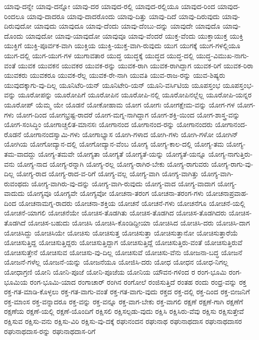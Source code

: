 {ಯಾವು-ದನ್ನೇ
ಯಾವು-ದನ್ನೋ
ಯಾವು-ದರ
ಯಾವುದ-ರಲ್ಲಿ
ಯಾವುದ-ರಲ್ಲಿಯೂ
ಯಾವುದ-ರಿಂದ
ಯಾವುದ-ರಿಂದಲೂ
ಯಾವು-ದಾದರೂ
ಯಾವು-ದಾದರೊಂದು
ಯಾವು-ದಿತ್ತು
ಯಾವು-ದಿದೆ
ಯಾವು-ದಿರುವುದು
ಯಾವು-ದಿರುವುದೋ
ಯಾವುದು
ಯಾವುದೂ
ಯಾವು-ದೆಂದು
ಯಾವು-ದೆಂಬು-ದನ್ನು
ಯಾವುದೇ
ಯಾವುದೊ
ಯಾವು-ದೊಂದು
ಯಾವುದೋ
ಯಾವು-ಯಾವುದೋ
ಯಾವುವೂ
ಯಾವು-ವೆಂದರೆ
ಯುಕ್ತ-ವೆಂದು
ಯುಕ್ತಾಯುಕ್ತ
ಯುಕ್ತಿ
ಯುಕ್ತಿಗೆ
ಯುಕ್ತಿ-ಪೂರ್ವಕ-ವಾಗಿ
ಯುಕ್ತಿಯ
ಯುಕ್ತಿ-ಯುಕ್ತ-ವಾಗಿ-ರುವುದು
ಯುಗ
ಯುಗಕ್ಕೆ
ಯುಗ-ಗಳಲ್ಲಿಯೂ
ಯುಗ-ದಲ್ಲಿ
ಯುಗ-ಯುಗ-ಗಳ
ಯುಗಾವತಾರ
ಯುದ್ಧ
ಯುದ್ಧಕ್ಕೆ
ಯುದ್ಧದ
ಯುದ್ಧ-ದಲ್ಲಿ
ಯುದ್ಧ-ವಿಮುಖ-ನಾಗು-ವಂತೆ
ಯುವಕ
ಯುವಕನ
ಯುವಕರ
ಯುವಕ-ರನ್ನು
ಯುವಕ-ರಾಗಿ
ಯುವಕ-ರಾಗಿದ್ದಾಗ
ಯುವಕ-ರಿಗೆ
ಯುವಕ-ರಿರಾ
ಯುವಕರು
ಯುವಕರೂ
ಯುವಕ-ರೆಲ್ಲ
ಯುವಕ-ರೇ-ನಾಗಿ
ಯುವತಿ
ಯುವ-ರಾಜ-ರನ್ನು
ಯುವ-ಶಿಷ್ಯರು
ಯುವುದಕ್ಕಾಗು-ವು-ದಿಲ್ಲ
ಯೂನಿಟೆರಿ-ಯನ್
ಯೂನಿಟೇರಿ-ಯನ್
ಯೂನಿ-ವರ್ಸಿಟಿಯ
ಯೂಪಸ್ತಂಭ
ಯೂಪಸ್ತಂಭ-ವನ್ನು
ಯೂರೋಪನ್ನು
ಯೂರೋಪಿಗೆ
ಯೂರೋಪಿನ
ಯೂರೋಪಿ-ನಲ್ಲಿ
ಯೂರೋಪಿನಲ್ಲೆಲ್ಲ
ಯೂರೋಪಿ-ಯನ್ನರ
ಯೂರೋಪ್
ಯೆಮ್ಮ
ಯೇ
ಯೊಡನೆ
ಯೋಕೋಹಾಮ
ಯೋಗ
ಯೋಗಃ
ಯೋಗಕ್ಷೇಮ-ವನ್ನು
ಯೋಗ-ಗಳ
ಯೋಗ-ಗಳು
ಯೋಗ-ದಿಂದ
ಯೋಗಭ್ರಷ್ಟ-ರಾದರೆ
ಯೋಗ-ಮಗ್ನ-ನಾಗಿದ್ದಾಗ
ಯೋಗ-ಶಕ್ತಿ-ಯಿಂದ
ಯೋಗ-ಶಾಸ್ತ್ರ-ವನ್ನು
ಯೋಗ-ಸಂಸಿದ್ಧಿಂ
ಯೋಗಾಚ್ಚಲಿತ-ಮಾನಸಃ
ಯೋಗಾನಂದ
ಯೋಗಾನಂದ-ರನ್ನು
ಯೋಗಾನಂದರು
ಯೋಗಾನಂದ-ರೊಡನೆ
ಯೋಗಾನಂದಸ್ವಾಮಿ-ಗಳು
ಯೋಗಾಭ್ಯಾಸ
ಯೋಗಿ-ಗಳಾದ
ಯೋಗಿ-ಗಳು
ಯೋಗಿ-ಗಳೋ
ಯೋಗಿನ್
ಯೋಗಿಯ
ಯೋಗೋದ್ಯಾನ-ದಲ್ಲಿ
ಯೋಗೋದ್ಯಾನ-ವೆಂಬ
ಯೋಗ್ಯ
ಯೋಗ್ಯ-ಕಾಲ-ದಲ್ಲಿ
ಯೋಗ್ಯ-ತಮ
ಯೋಗ್ಯ-ತಮ-ವಾದದ್ದು
ಯೋಗ್ಯ-ತಮವೇ
ಯೋಗ್ಯತಾ
ಯೋಗ್ಯತೆ
ಯೋಗ್ಯತೆ-ಯನ್ನು
ಯೋಗ್ಯತೆ-ಯನ್ನೂ
ಯೋಗ್ಯ-ನಾಗುತ್ತಿರು-ವನು
ಯೋಗ್ಯ-ನಾದ
ಯೋಗ್ಯ-ರನ್ನಾಗಿ
ಯೋಗ್ಯ-ರಲ್ಲ
ಯೋಗ್ಯ-ರಾಗಿರ-ಬೇಕು
ಯೋಗ್ಯ-ರಾಗುವರು
ಯೋಗ್ಯ-ರಾಗು-ವು-ದಿಲ್ಲ
ಯೋಗ್ಯ-ರಾದ
ಯೋಗ್ಯ-ರಾದ-ವ-ರಿಗೆ
ಯೋಗ್ಯ-ವಲ್ಲ
ಯೋಗ್ಯ-ವಾಗಿ
ಯೋಗ್ಯ-ವಾಗಿತ್ತು
ಯೋಗ್ಯ-ವಾಗಿ-ರುವಂಥದು
ಯೋಗ್ಯ-ವಾಗಿರು-ವು-ದನ್ನು
ಯೋಗ್ಯ-ವಾಗಿ-ರುವುದು
ಯೋಗ್ಯ-ವಾದ
ಯೋಗ್ಯ-ವಾದಾಗ
ಯೋಗ್ಯ-ವಾದುದು
ಯೋಗ್ಯವೂ
ಯೋಗ್ಯವೇ
ಯೋಗ್ಯವೋ
ಯೋಚನಾ-ತರಂಗ
ಯೋಚನಾ-ತರಂಗ-ಗಳು
ಯೋಚನಾಪ್ರವಾಹ-ದಿಂದ
ಯೋಚನಾಮಗ್ನ-ರಾದರು
ಯೋಚನಾ-ಶಕ್ತಿಯ
ಯೋಚನೆ
ಯೋಚನೆ-ಗಳು
ಯೋಚನೆಗೂ
ಯೋಚನೆ-ಯಲ್ಲಿ
ಯೋಚನೆ-ಯಾಗಲಿ
ಯೋಚನೆಯೇ
ಯೋಚಿಸ-ತೊಡಗಿತು
ಯೋಚಿಸ-ತೊಡಗಿದ
ಯೋಚಿಸ-ತೊಡಗಿದರು
ಯೋಚಿಸ-ತೊಡಗಿದೆ
ಯೋಚಿಸ-ಬಹುದು
ಯೋಚಿಸಿ
ಯೋಚಿಸಿ-ಕೊಂಡಿದ್ದೀಯಾ
ಯೋಚಿಸಿದ
ಯೋಚಿಸಿ-ದರು
ಯೋಚಿಸಿ-ದಾಗ
ಯೋಚಿಸಿದ್ದು
ಯೋಚಿಸಿಯೇ
ಯೋಚಿಸು
ಯೋಚಿಸುತ್ತ
ಯೋಚಿಸುತ್ತಾ
ಯೋಚಿಸುತ್ತಾನೋ
ಯೋಚಿಸುತ್ತಾರೆಯೆ
ಯೋಚಿಸುತ್ತಿದ್ದ
ಯೋಚಿಸುತ್ತಿದ್ದರು
ಯೋಚಿಸುತ್ತಿದ್ದಾಗ
ಯೋಚಿಸುತ್ತಿದ್ದೆ
ಯೋಚಿಸುತ್ತಿರು-ವಂತೆ
ಯೋಚಿಸುತ್ತಿರುವೆ
ಯೋಚಿಸುತ್ತೇನೆ
ಯೋಚಿಸುವ
ಯೋಚಿಸು-ವು-ದಿಲ್ಲ
ಯೋಚಿಸುವೆ
ಯೋಚಿಸು-ವೆನು
ಯೋಜನಾ-ಬದ್ಧ
ಯೋಜನೆ
ಯೋಜನೆ-ಗಳೆಲ್ಲ
ಯೋಜನೆ-ಯನ್ನು
ಯೋಜನೆಯೂ
ಯೋಜಿಸಿ-ದರು
ಯೋಧ
ಯೋಧನ
ಯೋಧ-ನಿಗಲ್ಲ
ಯೋಧಾಗ್ರಣಿ
ಯೋನಿ
ಯೋನಿ-ಪೂಜೆ
ಯೋನಿ-ಪೂಜೆಯ
ಯೋನಿಯ
ಯೌವನ-ಗಳಿಂದ
ರ
ರಂಗ-ಭೂಮಿ
ರಂಗ-ಭೂಮಿಯ
ರಂಗ-ಭೂಮಿ-ಯಾದ
ರಂಗಾಚಾರ್
ರಂಗಿನ
ರಂಗೋಲೆ
ರಂಜಿಸುತ್ತಿದೆ
ರಂತಹ
ರಂದು
ರಂಧ್ರ-ವನ್ನು
ರಕ್ತ
ರಕ್ತ-ಗತ-ಮಾಡಿ-ಕೊಳ್ಳಲು
ರಕ್ತ-ಗತ-ವಾಗು-ವಂತೆ
ರಕ್ತ-ಗತ-ವಾಗು-ವುದು
ರಕ್ತದ
ರಕ್ತ-ದಲ್ಲಿ
ರಕ್ತ-ದಿಂದ
ರಕ್ತ-ಬೀಜನಿಗೆ
ರಕ್ತ-ಮಾಂಸ
ರಕ್ತ-ವನ್ನಾದರೂ
ರಕ್ತ-ವನ್ನು
ರಕ್ತ-ವನ್ನೂ
ರಕ್ತ-ವಾಗ-ಬೇಕು
ರಕ್ತ-ವಾಗಲಿ
ರಕ್ಷಣೆ
ರಕ್ಷಣೆ-ಗಾಗಿ
ರಕ್ಷಣೆಗೆ
ರಕ್ಷಣೆಯ
ರಕ್ಷಣೆ-ಯಲ್ಲಿ
ರಕ್ಷಣೆ-ಯೊಂದಿಗೆ
ರಕ್ಷಿಸಲಿ
ರಕ್ಷಿಸಲ್ಪಡು-ವುದು
ರಕ್ಷಿಸಿ
ರಕ್ಷಿಸಿರು-ವೆವು
ರಕ್ಷಿಸು
ರಕ್ಷಿಸುತ್ತೇವೆ
ರಕ್ಷಿಸುವ
ರಕ್ಷಿಸು-ವನು
ರಕ್ಷಿಸು-ವಿರಿ
ರಕ್ಷಿಸು-ವು-ದಕ್ಕೆ
ರಘುನಂದನ
ರಘುನಾಥ
ರಘುನಾಥದಾಸ
ರಘುನಾಥದಾಸರ
ರಘುನಾಥದಾಸ-ರನ್ನು
ರಘುನಾಥದಾಸ-ರಿಗೆ
}
